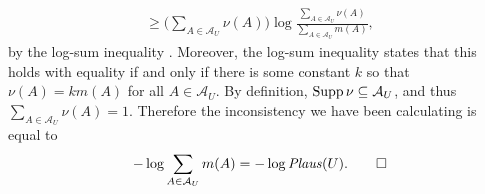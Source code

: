 \begin{subappendices}
\begin{lproof}
\begin{align*}
    \ge \Big({\textstyle\sum_{A \in \mathcal A_U} \nu(A)} \Big)
        \log \frac{\textstyle\sum_{A \in \mathcal A_U} \nu(A)}{{\textstyle\sum_{A \in \mathcal A_U} m(A)}},
    \end{align*}
    by the log-sum inequality \citep{CoverThomas}.
    Moreover, the log-sum inequality states that this holds 
    with equality if and only if there is some constant $k$ so that
        $\nu(A) = k m(A)$ for all $A \in \mathcal A_U$. 
    By definition, $\operatorname{\mathrm{Supp}} \nu \subseteq \mathcal A_U$, and thus
    $\sum_{A \in \mathcal A_U} \nu(A) = 1$. Therefore the inconsistency 
    we have been calculating is equal to
    \[
        - \log \sum_{A \in \mathcal A_U} m(A) = - \log \mathit{Plaus}(U).
        \qedhere
    \]
\end{lproof}

\end{subappendices}
